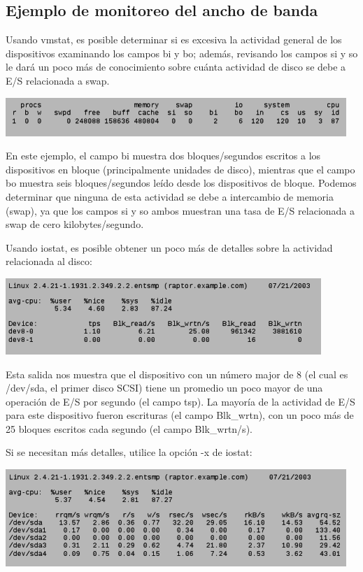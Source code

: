 \documentclass[12pt]{article}
\begin{document}
\subsection*{Ejemplo de monitoreo del ancho de banda}

Usando vmstat, es posible determinar si es excesiva la actividad general de los dispositivos examinando los campos bi y bo; además, revisando los campos si y so le dará un poco más de conocimiento sobre cuánta actividad de disco se debe a E/S relacionada a swap.

\begin{center}
 \includegraphics{vmstat1.png}
\end{center}

        
En este ejemplo, el campo bi muestra dos bloques/segundos escritos a los dispositivos en bloque (principalmente unidades de disco), mientras que el campo bo muestra seis bloques/segundos leído desde los dispositivos de bloque. Podemos determinar que ninguna de esta actividad se debe a intercambio de memoria (swap), ya que los campos si y so ambos muestran una tasa de E/S relacionada a swap de cero kilobytes/segundo.

Usando iostat, es posible obtener un poco más de detalles sobre la actividad relacionada al disco:

\begin{center}
 \includegraphics{iostat1.png}
\end{center}

Esta salida nos muestra que el dispositivo con un número major de 8 (el cual es /dev/sda, el primer disco SCSI) tiene un promedio un poco mayor de una operación de E/S por segundo (el campo tsp). La mayoría de la actividad de E/S para este dispositivo fueron escrituras (el campo Blk\_wrtn), con un poco más de 25 bloques escritos cada segundo (el campo Blk\_wrtn/s).

Si se necesitan más detalles, utilice la opción -x de iostat:

\begin{center}
 \includegraphics{iostat2.png}
\end{center}
\end{document}
